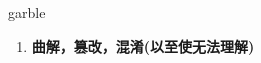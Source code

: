 
\begin{frame}
{\huge garble}
\begin{center}
\begin{enumerate}\Large
  \item \textbf{曲解，篡改，混淆(以至使无法理解)}
\end{enumerate}
\end{center}
\end{frame}
